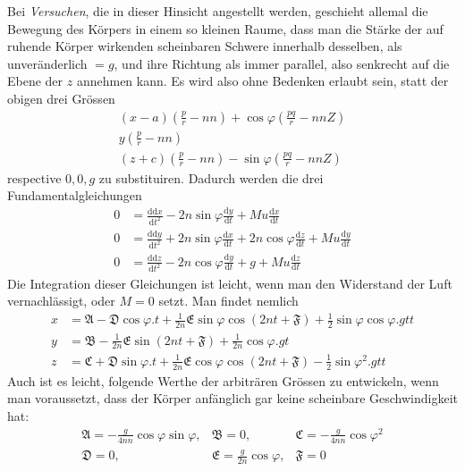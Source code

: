Bei \textit{Versuchen}, die in dieser Hinsicht angestellt werden, geschieht allemal die Bewegung des Körpers in einem so kleinen Raume, dass man die Stärke der auf ruhende Körper wirkenden scheinbaren Schwere innerhalb desselben, als unveränderlich $=g$, und ihre Richtung als immer parallel, also senkrecht auf die Ebene der $z$ annehmen kann. Es wird also ohne Bedenken erlaubt sein, statt der obigen drei Grössen
\[
\begin{gathered}
(x-a)(\tfrac pr-nn)+\cos\varphi(\tfrac{pq}{r}-nnZ)\\
y(\tfrac pr-nn)\\
(z+c)(\tfrac pr-nn)-\sin\varphi(\tfrac{pq}{r}-nnZ)
\end{gathered}
\]
respective $0,0,g$ zu substituiren. Dadurch werden die drei Fundamentalgleichungen
\[
\begin{aligned}
0&=\frac{\mathrm{dd}x}{\mathrm{d}t^2}-2n\sin\varphi\frac{\mathrm{d}y}{\mathrm{d}t}+Mu\frac{\mathrm{d}x}{\mathrm{d}t}\\
0&=\frac{\mathrm{dd}y}{\mathrm{d}t^2}+2n\sin\varphi\frac{\mathrm{d}x}{\mathrm{d}t}+2n\cos\varphi\frac{\mathrm{d}z}{\mathrm{d}t}+Mu\frac{\mathrm{d}y}{\mathrm{d}t}\\
0&=\frac{\mathrm{dd}z}{\mathrm{d}t^2}-2n\cos\varphi\frac{\mathrm{d}y}{\mathrm{d}t}+g+Mu\frac{\mathrm{d}z}{\mathrm{d}t}
\end{aligned}
\]
Die Integration dieser Gleichungen ist leicht, wenn man den Widerstand der Luft vernachlässigt, oder $M=0$ setzt. Man findet nemlich
\[
\begin{aligned}
x&=\mathfrak{A}-\mathfrak{D}\cos\varphi.t+\tfrac{1}{2n}\mathfrak{E}\sin\varphi\cos(2nt+\mathfrak{F})+\tfrac12\sin\varphi\cos\varphi.gtt\\
y&=\mathfrak{B}-\tfrac{1}{2n}\mathfrak{E}\sin(2nt+\mathfrak{F})+\tfrac{1}{2n}\cos\varphi.gt\\
z&=\mathfrak{C}+\mathfrak{D}\sin\varphi.t+\tfrac{1}{2n}\mathfrak{E}\cos\varphi\cos(2nt+\mathfrak{F})-\tfrac12\sin\varphi^2.gtt
\end{aligned}
\]
Auch ist es leicht, folgende Werthe der arbiträren Grössen zu entwickeln, wenn man voraussetzt, dass der Körper anfänglich gar keine scheinbare Geschwindigkeit hat:
\[
\begin{array}{lll}
\mathfrak{A}=-\tfrac{g}{4nn}\cos\varphi\sin\varphi,&\mathfrak{B}=0,&\mathfrak{C}=-\tfrac{g}{4nn}\cos\varphi^2\\
\mathfrak{D}=0,&\mathfrak{E}=\tfrac{g}{2n}\cos\varphi,&\mathfrak{F}=0
\end{array}
\]

